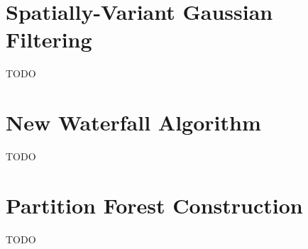 \section{Spatially-Variant Gaussian Filtering}

TODO

\iffalse
+ Does help to improve the segmentation results somewhat
+ Quick to run
+ Easy to understand
+ Easy to implement
- Rather poor end results compared to e.g.~anisotropic diffusion filtering
\fi

\section{New Waterfall Algorithm}

TODO

\iffalse
# Based on Chris's work
+ Produces results that do not depend on the implementation of key data structures (like Marcotegui's) or where the MST is rooted (like Chris's)
+ Efficient, linear-time algorithm
+ Useful as a first step in other waterfall algorithms, because it carefully pins down the types of different edges
+ Easy to implement
- Produces results that depend on which MST is constructed (all MST-based algorithms, including Chris's, necessarily do this -- the only alternative is to run the waterfall on a graph and accept that it will be slower)
- Requires a constant factor more work than Chris's
- Not as easy to implement as Chris's
- The 'incorrect' version of Chris's actually produces better results than either this one or Chris's 'correct' version(!)
\fi

\section{Partition Forest Construction}

TODO

\iffalse
+ Works for both 2D and 3D segmentation, because it's designed using subvolumes
+ No comparison in the literature
- Relatively slow, primarily because of the significant preprocessing time required (anisotropic diffusion filtering, at least as implemented in ITK, is slow as hell)
- Construction process uses twice as much memory as the finished partition forest
\fi

